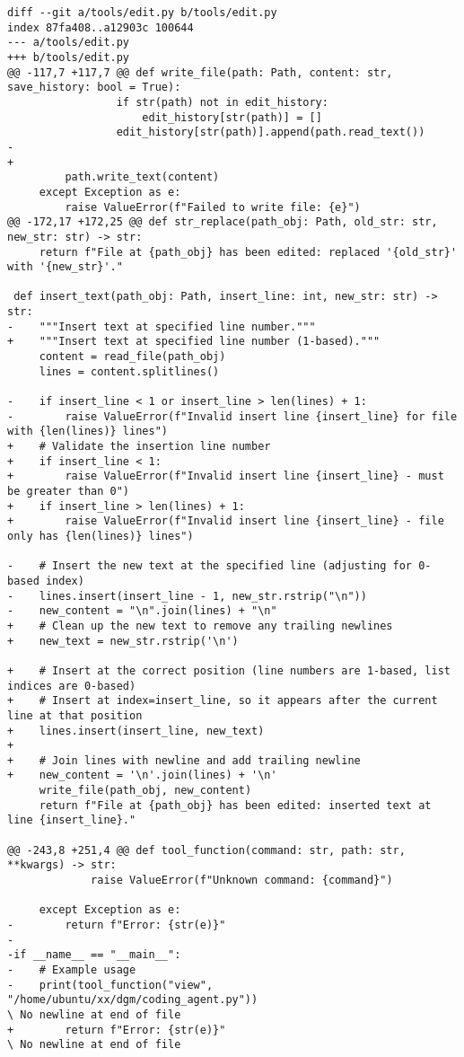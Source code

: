 \begin{lstlisting}[style=diffstyle]
diff --git a/tools/edit.py b/tools/edit.py
index 87fa408..a12903c 100644
--- a/tools/edit.py
+++ b/tools/edit.py
@@ -117,7 +117,7 @@ def write_file(path: Path, content: str, save_history: bool = True):
                 if str(path) not in edit_history:
                     edit_history[str(path)] = []
                 edit_history[str(path)].append(path.read_text())
-
+        
         path.write_text(content)
     except Exception as e:
         raise ValueError(f"Failed to write file: {e}")
@@ -172,17 +172,25 @@ def str_replace(path_obj: Path, old_str: str, new_str: str) -> str:
     return f"File at {path_obj} has been edited: replaced '{old_str}' with '{new_str}'."
 
 def insert_text(path_obj: Path, insert_line: int, new_str: str) -> str:
-    """Insert text at specified line number."""
+    """Insert text at specified line number (1-based)."""
     content = read_file(path_obj)
     lines = content.splitlines()
 
-    if insert_line < 1 or insert_line > len(lines) + 1:
-        raise ValueError(f"Invalid insert line {insert_line} for file with {len(lines)} lines")
+    # Validate the insertion line number
+    if insert_line < 1:
+        raise ValueError(f"Invalid insert line {insert_line} - must be greater than 0")
+    if insert_line > len(lines) + 1:
+        raise ValueError(f"Invalid insert line {insert_line} - file only has {len(lines)} lines")
 
-    # Insert the new text at the specified line (adjusting for 0-based index)
-    lines.insert(insert_line - 1, new_str.rstrip("\n"))
-    new_content = "\n".join(lines) + "\n"
+    # Clean up the new text to remove any trailing newlines
+    new_text = new_str.rstrip('\n')
     
+    # Insert at the correct position (line numbers are 1-based, list indices are 0-based)
+    # Insert at index=insert_line, so it appears after the current line at that position
+    lines.insert(insert_line, new_text)
+
+    # Join lines with newline and add trailing newline
+    new_content = '\n'.join(lines) + '\n'
     write_file(path_obj, new_content)
     return f"File at {path_obj} has been edited: inserted text at line {insert_line}."
 
@@ -243,8 +251,4 @@ def tool_function(command: str, path: str, **kwargs) -> str:
             raise ValueError(f"Unknown command: {command}")
 
     except Exception as e:
-        return f"Error: {str(e)}"
-
-if __name__ == "__main__":
-    # Example usage
-    print(tool_function("view", "/home/ubuntu/xx/dgm/coding_agent.py"))
\ No newline at end of file
+        return f"Error: {str(e)}"
\ No newline at end of file
\end{lstlisting}